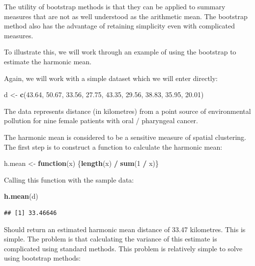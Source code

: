 \documentclass[12pt,a4paper]{book}
\newenvironment{Shaded}{\begin{snugshade}}{\end{snugshade}}
\newcommand{\KeywordTok}[1]{\textcolor[rgb]{0.13,0.29,0.53}{\textbf{#1}}}
\newcommand{\DecValTok}[1]{\textcolor[rgb]{0.00,0.00,0.81}{#1}}
\newcommand{\FloatTok}[1]{\textcolor[rgb]{0.00,0.00,0.81}{#1}}
\newcommand{\StringTok}[1]{\textcolor[rgb]{0.31,0.60,0.02}{#1}}
\newcommand{\ControlFlowTok}[1]{\textcolor[rgb]{0.13,0.29,0.53}{\textbf{#1}}}
\newcommand{\OperatorTok}[1]{\textcolor[rgb]{0.81,0.36,0.00}{\textbf{#1}}}
\newcommand{\NormalTok}[1]{#1}
\theoremstyle{definition}
\theoremstyle{definition}
\theoremstyle{definition}
\theoremstyle{remark}
\begin{document}
The utility of bootstrap methods is that they can be applied to summary
measures that are not as well understood as the arithmetic mean. The
bootstrap method also has the advantage of retaining simplicity even
with complicated measures.

To illustrate this, we will work through an example of using the
bootstrap to estimate the harmonic mean.

Again, we will work with a simple dataset which we will enter directly:

\begin{Shaded}
\begin{Highlighting}[]
\NormalTok{d <-}\StringTok{ }\KeywordTok{c}\NormalTok{(}\FloatTok{43.64}\NormalTok{, }\FloatTok{50.67}\NormalTok{, }\FloatTok{33.56}\NormalTok{, }\FloatTok{27.75}\NormalTok{, }\FloatTok{43.35}\NormalTok{, }\FloatTok{29.56}\NormalTok{, }\FloatTok{38.83}\NormalTok{, }\FloatTok{35.95}\NormalTok{, }\FloatTok{20.01}\NormalTok{)}
\end{Highlighting}
\end{Shaded}

The data represents distance (in kilometres) from a point source of
environmental pollution for nine female patients with oral / pharyngeal
cancer.

The harmonic mean is considered to be a sensitive measure of spatial
clustering. The first step is to construct a function to calculate the
harmonic mean:

\begin{Shaded}
\begin{Highlighting}[]
\NormalTok{h.mean <-}\StringTok{ }\ControlFlowTok{function}\NormalTok{(x) \{}\KeywordTok{length}\NormalTok{(x) }\OperatorTok{/}\StringTok{ }\KeywordTok{sum}\NormalTok{(}\DecValTok{1} \OperatorTok{/}\StringTok{ }\NormalTok{x)\}}
\end{Highlighting}
\end{Shaded}

Calling this function with the sample data:

\begin{Shaded}
\begin{Highlighting}[]
\KeywordTok{h.mean}\NormalTok{(d)}
\end{Highlighting}
\end{Shaded}

\begin{verbatim}
## [1] 33.46646
\end{verbatim}

Should return an estimated harmonic mean distance of 33.47 kilometres.
This is simple. The problem is that calculating the variance of this
estimate is complicated using standard methods. This problem is
relatively simple to solve using bootstrap methods:
\end{document}
